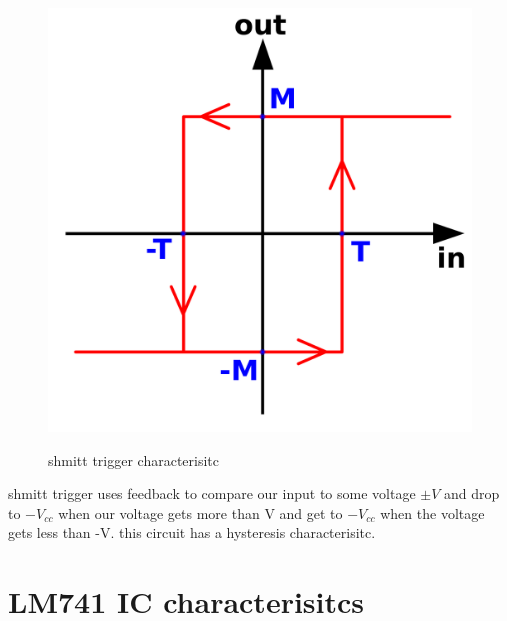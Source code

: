 \documentclass[11pt]{article}
\begin{document}
\begin{figure}[H]
    \begin{center}
        \includegraphics[scale=0.1]{Fig/schmitt-characteristic.png}
        \label{fig:schmitt trigger characterisitcs}
        \caption{shmitt trigger characterisitc}
    \end{center}
\end{figure}
shmitt trigger uses feedback to compare our input to some voltage $\pm V$ and drop to $-V_{cc}$ when our voltage
gets more than V and get to $-V_{cc}$ when the voltage gets less than -V. this circuit has a hysteresis characterisitc.




\section{LM741 IC characterisitcs}
\end{document}
